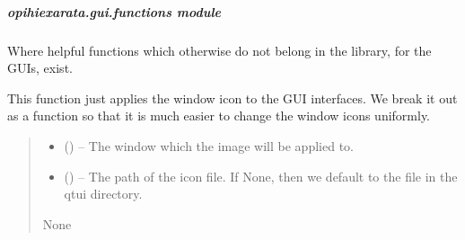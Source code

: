 \documentclass[letterpaper,11pt,english]{sphinxmanual}
\begin{document}
\sphinxstepscope


\subparagraph{opihiexarata.gui.functions module}
\label{\detokenize{code/opihiexarata.gui.functions:module-opihiexarata.gui.functions}}\label{\detokenize{code/opihiexarata.gui.functions:opihiexarata-gui-functions-module}}\label{\detokenize{code/opihiexarata.gui.functions::doc}}
\sphinxAtStartPar
Where helpful functions which otherwise do not belong in the library,
for the GUIs, exist.

\begin{savenotes}\begin{fulllineitems}
\label{\detokenize{code/opihiexarata.gui.functions:opihiexarata.gui.functions.apply_window_icon}}
\pysigstartsignatures
{}
\pysigstopsignatures
\sphinxAtStartPar
This function just applies the window icon to the GUI interfaces.
We break it out as a function so that it is much easier to change the
window icons uniformly.
\begin{quote}\begin{description}
\begin{itemize}
\item {} 
\sphinxAtStartPar
{} (\sphinxstyleliteralemphasis{\sphinxupquote{, }}) – The window which the image will be applied to.

\item {} 
\sphinxAtStartPar
{} (\sphinxstyleliteralemphasis{\sphinxupquote{, }}) – The path of the icon file. If None, then we default to the
 file in the qtui directory.

\end{itemize}

\sphinxAtStartPar
None

\end{description}\end{quote}

\end{fulllineitems}\end{savenotes}
\end{document}
